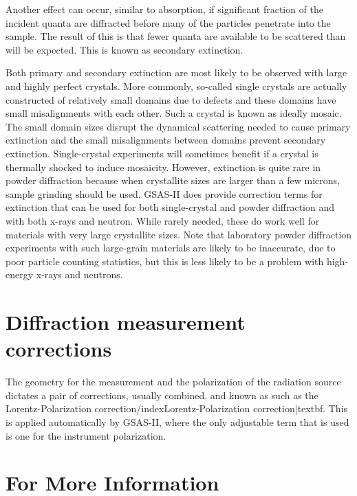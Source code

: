 Another effect can occur, similar to absorption, if significant fraction of the incident quanta are diffracted before many of the particles penetrate into the sample. The result of this is that fewer quanta are available to be scattered than will be expected. This is known as secondary extinction. 

Both primary and secondary extinction are most likely to be observed with large and highly perfect crystals. More commonly, so-called single crystals are actually constructed of relatively small domains due to defects and these domains have small misalignments with each other. Such a crystal is known as ideally mosaic. The small domain sizes disrupt the dynamical scattering needed to cause primary extinction and the small misalignments between domains prevent secondary extinction. Single-crystal experiments will sometimes benefit if a crystal is thermally shocked to induce mosaicity. However, extinction is quite rare in powder diffraction because when crystallite sizes are larger than a few microns, sample grinding should be used. GSAS-II does provide correction terms for extinction that can be used for both single-crystal and powder diffraction and with both x-rays and neutron. While rarely needed, these do work well for materials with very large crystallite sizes. Note that laboratory powder diffraction experiments with such large-grain materials are likely to be inaccurate, due to poor particle counting statistics, but this is less likely to be a problem with high-energy x-rays and neutrons.  

\section{Diffraction measurement corrections}
The geometry for the measurement and the polarization of the radiation source dictates a pair of corrections, usually combined, and known as such as the Lorentz-Polarization correction/index{Lorentz-Polarization correction|textbf}. This is applied automatically by GSAS-II, where the only adjustable term that is used is one for the instrument polarization. 

\section{For More Information}

